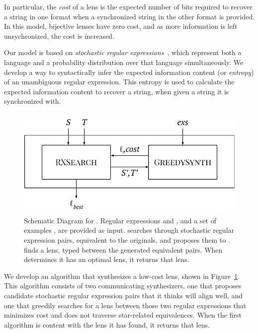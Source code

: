 \documentclass[acmsmall,screen,anonymous]{acmart}
\begin{document}
In particular, the \emph{cost} of a lens is the expected number of bits required to
recover a string in one format when a synchronized string in the other format is
provided. In this model, bijective lenses have zero cost, and as more
information is left unsychronized, the cost is increased.

Our model is based on \emph{stochastic regular expressions}~\cite{?}, which
represent both a language and a probability distribution over that language
simultaneously.  We develop a way to syntactically infer the expected
information content (or \emph{entropy}) of an unambiguous regular
expression. This entropy is used to calculate the expected information content
to recover a string, when given a string it is synchronized with.

\begin{figure}
  \includegraphics[width=.5\textwidth]{high-level-algorithm.pdf}
  \caption{Schematic Diagram for \SOptician. Regular expressions \Regex and
    \RegexAlt, and a set of examples \Examples, are provided as input. \RXSearch
    searches through stochastic regular expression pairs, equivalent to the
    originals, and proposes them to \GreedySynth. \GreedySynth finds a lens,
    typed between the generated equivalent pairs. When \RXSearch determines it
    has an optimal lens, it returns that lens.}
  \label{fig:high-level-algorithm}
\end{figure}


We develop an algorithm that synthesizes a low-cost lens, shown in
Figure~\ref{fig:high-level-algorithm}. This algorithm consists of two
communicating synthesizers, one that proposes candidate stochastic regular
expression pairs that it thinks will align well, and one that greedily searches
for a lens between those two regular expressions that minimizes cost and does
not traverse star-related equivalences. When the first algorithm is content with
the lens it has found, it returns that lens. 
\end{document}
